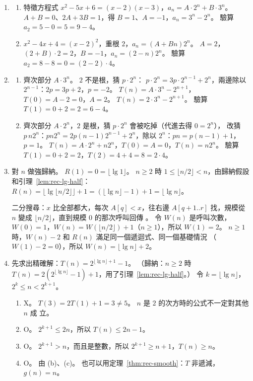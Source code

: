 \begin{enumerate}
\item
\begin{enumerate}
\item 特徵方程式 $x^2 - 5x + 6 = (x - 2)(x - 3)$，$a_n = A \cdot 2^n + B \cdot 3^n$。
$A + B = 0$、$2A + 3B = 1$，得 $B = 1$、$A = -1$，$a_n = 3^n - 2^n$。 驗算
$a_2 = 5 - 0 = 5 = 9 - 4$。
\item $x^2 - 4x + 4 = (x - 2)^2$，重根 $2$，$a_n = (A + Bn) 2^n$。 $A = 2$，
$(2 + B) \cdot 2 = 2$，$B = -1$，$a_n = (2 - n) 2^n$。 驗算
$a_2 = 8 - 8 = 0 = (2 - 2) \cdot 4$。
\end{enumerate}

\item
\begin{enumerate}
\item 齊次部分 $A \cdot 3^n$。 $2$ 不是根，猜 $p \cdot 2^n$：
$p \cdot 2^n = 3p \cdot 2^{n-1} + 2^n$，兩邊除以 $2^{n-1}$：$2p = 3p + 2$，$p = -2$。
$T(n) = A \cdot 3^n - 2^{n+1}$，$T(0) = A - 2 = 0$，$A = 2$。
$T(n) = 2 \cdot 3^n - 2^{n+1}$。 驗算 $T(1) = 0 + 2 = 2 = 6 - 4$。
\item 齊次部分 $A \cdot 2^n$，$2$ 是根，猜 $p \cdot 2^n$ 會被吃掉（代進去得 $0 = 2^n$），
改猜 $p\, n 2^n$：$p n 2^n = 2p(n-1) 2^{n-1} + 2^n$，除以 $2^n$：$pn = p(n - 1) + 1$，
$p = 1$。 $T(n) = A \cdot 2^n + n 2^n$，$T(0) = A = 0$，$T(n) = n 2^n$。 驗算
$T(1) = 0 + 2 = 2$，$T(2) = 4 + 4 = 8 = 2 \cdot 4$。
\end{enumerate}

\item 對 $n$ 做強歸納。 $R(1) = 0 = \lfloor \lg 1 \rfloor$。 $n \ge 2$ 時
$1 \le \lfloor n/2 \rfloor < n$，由歸納假設和引理~\ref{lem:rec-lg-half}：
$R(n) = \lfloor \lg \lfloor n/2 \rfloor \rfloor + 1 = (\lfloor \lg n \rfloor - 1) + 1
= \lfloor \lg n \rfloor$。

二分搜尋：$x$ 比全部都大，每次 $A[q] < x$，往右邊 $A[q+1..r]$ 找，規模從 $n$ 變成
$\lfloor n/2 \rfloor$，直到規模 $0$ 的那次呼叫回傳 \NIL。 令 $W(n)$ 是呼叫次數，
$W(0) = 1$，$W(n) = W(\lfloor n/2 \rfloor) + 1$（$n \ge 1$），所以 $W(1) = 2$。
$n \ge 1$ 時，$W(n) - 2$ 和 $R(n)$ 滿足同一個遞迴式、同一個基礎情況
（$W(1) - 2 = 0$），所以 $W(n) = \lfloor \lg n \rfloor + 2$。

\item 先求出精確解：$T(n) = 2^{\lfloor \lg n \rfloor + 1} - 1$。 （歸納：$n \ge 2$ 時
$T(n) = 2(2^{\lfloor \lg n \rfloor} - 1) + 1$，用了引理~\ref{lem:rec-lg-half}。）
令 $k = \lfloor \lg n \rfloor$，$2^k \le n < 2^{k+1}$。
\begin{enumerate}
\item X。 $T(3) = 2T(1) + 1 = 3 \ne 5$。 $n$ 是 $2$ 的次方時的公式不一定對其他 $n$ 成
立。
\item O。 $2^{k+1} \le 2n$，所以 $T(n) \le 2n - 1$。
\item O。 $2^{k+1} > n$，而且是整數，所以 $2^{k+1} \ge n + 1$，$T(n) \ge n$。
\item O。 由 (b)、(c)。 也可以用定理~\ref{thm:rec-smooth}：$T$ 非遞減，$g(n) = n$。
\end{enumerate}


\end{enumerate}
